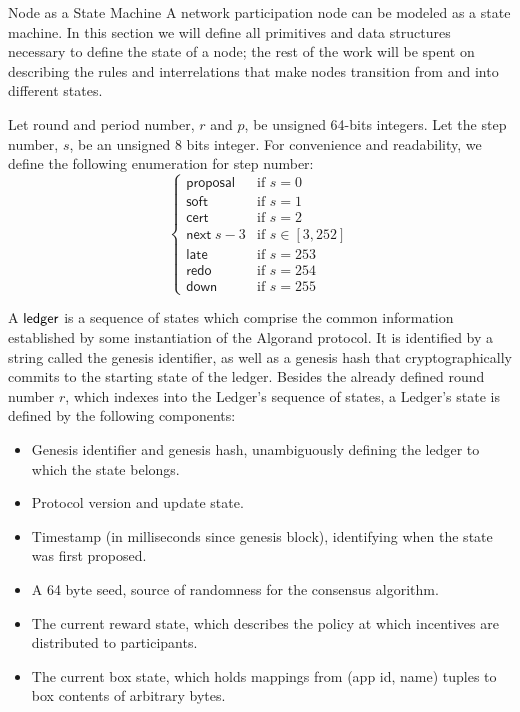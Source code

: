 \documentclass[10pt,a4paper]{article}
\begin{document}
\begin{section}{Node as a State Machine}
A network participation node can be modeled as a state machine.
In this section we will define all primitives and data structures necessary to define the state
of a node; the rest of the work will be spent on describing the rules and interrelations that
make nodes transition from and into different states.

Let round and period number, $r$ and $p$, be unsigned 64-bits integers. Let the 
step number, $s$, be an unsigned 8 bits integer.
For convenience and readability, we define the following enumeration for step number:
$$
\left\{    
    \begin{array}{ll}
        \mathsf{proposal}&\mbox{if }s=0 \\
        \mathsf{soft}&\mbox{if }s=1 \\
        \mathsf{cert}&\mbox{if }s=2\\
        \mathsf{next}\;s-3&\mbox{if }s\in [3, 252]\\
        \mathsf{late}&\mbox{if }s=253\\
        \mathsf{redo}&\mbox{if }s=254\\
        \mathsf{down}&\mbox{if }s=255
    \end{array}
\right.
$$

A ${\sf ledger}$ is a sequence of states which comprise the common information established by some instantiation 
of the Algorand protocol.
It is identified by a string called the genesis identifier, as well as a genesis hash that cryptographically 
commits to the starting state of the ledger.
Besides the already defined round number $r$, which indexes into the Ledger's sequence of states,
a Ledger's state is defined by the following components:
\begin{itemize}
    \item Genesis identifier and genesis hash, unambiguously defining the ledger 
    to which the state belongs.
    \item Protocol version and update state.
    \item Timestamp (in milliseconds since genesis block), identifying when the state was first proposed.
    \item A 64 byte seed, source of randomness for the consensus algorithm.
    \item The current reward state, which describes the policy at which incentives
    are distributed to participants.
    \item The current box state, which holds mappings from (app id, name) tuples
    to box contents of arbitrary bytes.
\end{itemize}


\end{section}
\end{document}
